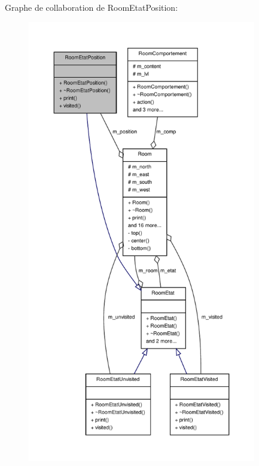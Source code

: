 Graphe de collaboration de Room\-Etat\-Position\-:
\nopagebreak
\begin{figure}[H]
\begin{center}
\leavevmode
\includegraphics[height=550pt]{class_room_etat_position__coll__graph}
\end{center}
\end{figure}
